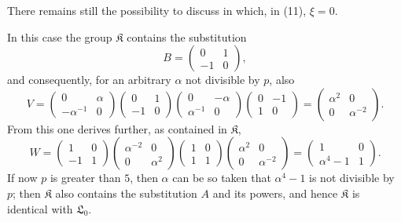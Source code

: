 \documentclass[11pt]{article}
\newcommand{\Lzero}{\mathfrak L_0}
\newcommand{\Kgrp}{\mathfrak K}
\begin{document}
There remains still the possibility to discuss in which, in (11), $\xi=0$.

In this case the group $\Kgrp$ contains the substitution
\[
 B=\begin{pmatrix}0&1\\-1&0\end{pmatrix},
\]
and consequently, for an arbitrary $\alpha$ not divisible by $p$, also
\[
 V=\begin{pmatrix}0&\alpha\\-\alpha^{-1}&0\end{pmatrix}
 \begin{pmatrix}0&1\\-1&0\end{pmatrix}
 \begin{pmatrix}0&-\alpha\\\alpha^{-1}&0\end{pmatrix}
 \begin{pmatrix}0&-1\\1&0\end{pmatrix}
 =\begin{pmatrix}\alpha^2&0\\0&\alpha^{-2}\end{pmatrix}.
\]
From this one derives further, as contained in $\Kgrp$,
\[
 W=\begin{pmatrix}1&0\\-1&1\end{pmatrix}
 \begin{pmatrix}\alpha^{-2}&0\\0&\alpha^2\end{pmatrix}
 \begin{pmatrix}1&0\\1&1\end{pmatrix}
 \begin{pmatrix}\alpha^2&0\\0&\alpha^{-2}\end{pmatrix}
 =\begin{pmatrix}1&0\\ \alpha^4-1&1\end{pmatrix}.
\]
If now $p$ is greater than $5$, then $\alpha$ can be so taken that $\alpha^4-1$ is not divisible by $p$; then $\Kgrp$ also contains the substitution $A$ and its powers, and hence $\Kgrp$ is identical with $\Lzero$.
\end{document}
